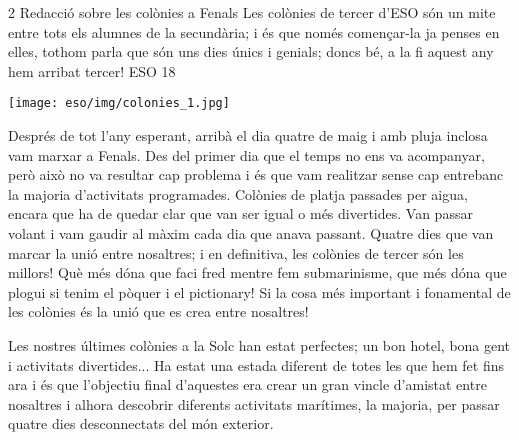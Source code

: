\begin{news}
{2} %
{Redacció sobre les colònies a Fenals}
{Les colònies de tercer d’ESO són un mite entre tots els alumnes de la secundària; i és que només començar-la ja penses en elles, tothom parla que són uns dies únics i genials; doncs bé, a la fi aquest any hem arribat  tercer!}
{ESO}
{18} %

\noindent\texttt{[image: eso/img/colonies\_1.jpg]}

Després de tot l’any esperant,  arribà el dia quatre de maig i amb pluja inclosa vam marxar a Fenals. Des del primer dia que el temps no ens va acompanyar, però això no va resultar cap problema i és que vam realitzar sense cap entrebanc la majoria d’activitats programades.  Colònies de platja passades per aigua, encara que ha de quedar clar que van ser igual o més divertides. Van passar volant i vam gaudir al màxim cada dia que anava passant. Quatre dies que van marcar la unió entre nosaltres; i en definitiva, les colònies de tercer són les millors! Què més dóna que faci fred mentre fem submarinisme, que més dóna que plogui si tenim el pòquer i el pictionary! Si la cosa més important i fonamental de les colònies és la unió que es crea entre nosaltres!

Les nostres últimes colònies a la Solc han estat perfectes; un bon hotel, bona gent i activitats divertides... Ha estat una estada diferent de totes les que hem fet fins ara i és que l’objectiu final d’aquestes era crear un gran vincle d’amistat entre nosaltres i alhora descobrir diferents activitats marítimes, la majoria, per passar quatre dies desconnectats del món exterior.


\end{news}

\newssep

